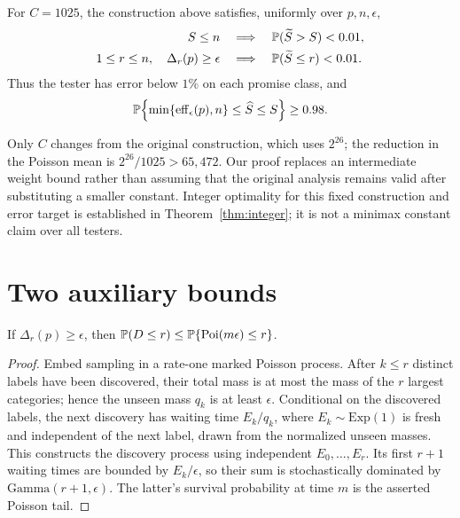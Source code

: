 \begin{theorem}\label{thm:main}
For $C=1025$, the construction above satisfies, uniformly over $p,n,\epsilon$,
\begin{align}
 S\le n&\quad\Longrightarrow\quad
     \mathbb P(\widetilde S>S)<0.01,\label{eq:upper}\\
 1\le r\le n,\quad\Delta_r(p)\ge\epsilon
     &\quad\Longrightarrow\quad
     \mathbb P(\widetilde S\le r)<0.01.\label{eq:lower}
\end{align}
Thus the tester has error below $1\%$ on each promise class, and
\begin{equation}
 \mathbb P\!\left\{\min\{\operatorname{eff}_\epsilon(p),n\}\le\widehat S\le S\right\}
 \ge0.98.\label{eq:coverage}
\end{equation}
\end{theorem}

Only $C$ changes from the original construction, which uses $2^{26}$;
the reduction in the Poisson mean is $2^{26}/1025>65{,}472$.
Our proof replaces an intermediate weight bound rather than assuming
that the original analysis remains valid after substituting a smaller
constant. Integer optimality for this fixed construction and error target
is established in Theorem~\ref{thm:integer}; it is not a minimax constant
claim over all testers.

\section{Two auxiliary bounds}
\begin{lemma}\label{lem:count}
If $\Delta_r(p)\ge\epsilon$, then
$\mathbb P(D\le r)\le\mathbb P\{\operatorname{Poi}(m\epsilon)\le r\}$.
\end{lemma}
\begin{proof}
Embed sampling in a rate-one marked Poisson process. After $k\le r$
distinct labels have been discovered, their total mass is at most the mass
of the $r$ largest categories; hence the unseen mass $q_k$ is at least
$\epsilon$. Conditional on the discovered labels, the next discovery has
waiting time $E_k/q_k$, where $E_k\sim\mathrm{Exp}(1)$ is fresh and
independent of the next label, drawn from the normalized unseen masses.
This constructs the discovery process using independent $E_0,\ldots,E_r$.
Its first $r+1$ waiting times are bounded by $E_k/\epsilon$, so their sum
is stochastically dominated by $\mathrm{Gamma}(r+1,\epsilon)$.
The latter's survival probability at time $m$ is the asserted Poisson tail.
\end{proof}

